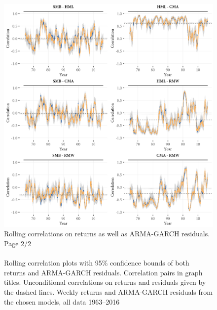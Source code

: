 \begin{figure}[H]
  \centering
  \footnotesize
  \caption{Rolling correlations on returns as well as ARMA-GARCH residuals. Page 2/2 \\ \quad \\
  Rolling correlation plots with 95\% confidence bounds of both returns and ARMA-GARCH residuals. Correlation pairs in graph titles. Unconditional correlations on returns and residuals given by the dashed lines. Weekly returns and ARMA-GARCH residuals from the chosen models, all data 1963--2016}
  \label{fig:appendix_rolling2}
  \includegraphics[scale=1]{graphics/appendix_rolling2.png}  
\end{figure}
